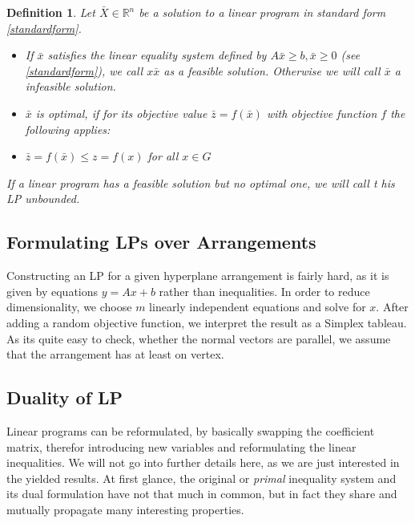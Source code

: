 \documentclass[a4paper, 11pt]{article}
\makeatletter
\newtheorem{mydef}{Definition}
\renewenvironment{quotation}
{\list{}{\listparindent=1.5em
		\itemindent=0pt
		\parsep\z@ \@plus\p@}%
	\item\relax}
{\endlist}
\makeatother
\begin{document}
\begin{mydef}
	Let $\bar{X} \in \mathbb{R}^n$ be a solution to a linear program in standard form \ref{standardform}.\\
	\begin{itemize}
		\item[(1)] If $\bar{x}$ satisfies the linear equality system defined by $A\bar{x}\geq b, \bar{x}\geq 0$ (see \ref{standardform}), we call $x\bar{x}$ as a \emph{feasible solution}. Otherwise we will call $\bar{x}$ a infeasible solution.
		\item[(2)] $\bar{x}$ is \emph{optimal}, if for its objective value $\bar{z} = f(\bar{x})$ with objective function $f$ the following applies:
		\begin{quotation}
			$\bar{z} = f(\bar{x}) \leq z = f(x)$ for all $x\in G$
		\end{quotation}
	\end{itemize}
	If a linear program has a feasible solution but no optimal one, we will call t his LP unbounded.
\end{mydef}

\subsection{Formulating LPs over Arrangements}
Constructing an LP for a given hyperplane arrangement is fairly hard, as it is given by equations $y=Ax + b$ rather than inequalities. In order to reduce dimensionality, we choose $m$ linearly independent equations and solve for $x$. After adding a random objective function, we interpret the result as a Simplex tableau. As its quite easy to check, whether the normal vectors are parallel, we assume that the arrangement has at least on vertex.


\subsection{Duality of LP}
Linear programs can be reformulated, by basically \glqq swapping\grqq{} the coefficient matrix, therefor introducing new variables and reformulating the linear inequalities. We will not go into further details here, as we are just interested in the yielded results. At first glance, the original or \textit{primal} inequality system and its dual formulation have not that much in common, but in fact they share and mutually propagate many interesting properties. \\
\end{document}
